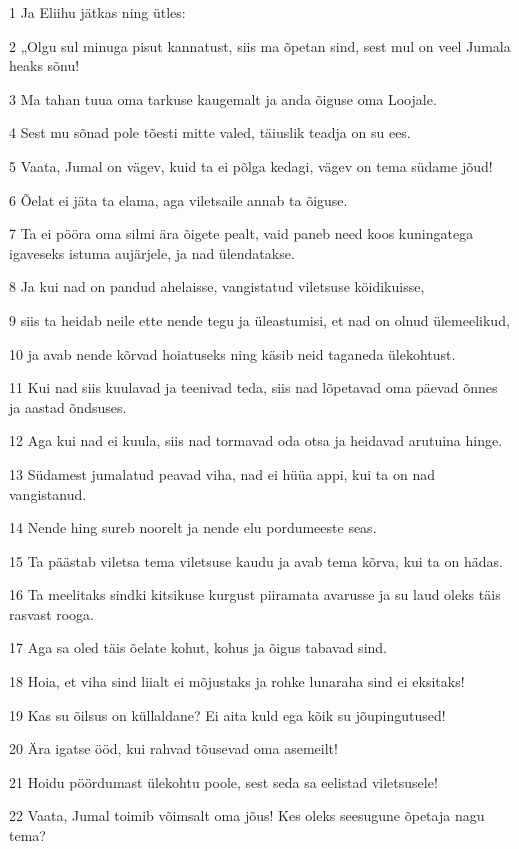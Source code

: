 \par 1 Ja Eliihu jätkas ning ütles:
\par 2 „Olgu sul minuga pisut kannatust, siis ma õpetan sind, sest mul on veel Jumala heaks sõnu!
\par 3 Ma tahan tuua oma tarkuse kaugemalt ja anda õiguse oma Loojale.
\par 4 Sest mu sõnad pole tõesti mitte valed, täiuslik teadja on su ees.
\par 5 Vaata, Jumal on vägev, kuid ta ei põlga kedagi, vägev on tema südame jõud!
\par 6 Õelat ei jäta ta elama, aga viletsaile annab ta õiguse.
\par 7 Ta ei pööra oma silmi ära õigete pealt, vaid paneb need koos kuningatega igaveseks istuma aujärjele, ja nad ülendatakse.
\par 8 Ja kui nad on pandud ahelaisse, vangistatud viletsuse köidikuisse,
\par 9 siis ta heidab neile ette nende tegu ja üleastumisi, et nad on olnud ülemeelikud,
\par 10 ja avab nende kõrvad hoiatuseks ning käsib neid taganeda ülekohtust.
\par 11 Kui nad siis kuulavad ja teenivad teda, siis nad lõpetavad oma päevad õnnes ja aastad õndsuses.
\par 12 Aga kui nad ei kuula, siis nad tormavad oda otsa ja heidavad arutuina hinge.
\par 13 Südamest jumalatud peavad viha, nad ei hüüa appi, kui ta on nad vangistanud.
\par 14 Nende hing sureb noorelt ja nende elu pordumeeste seas.
\par 15 Ta päästab viletsa tema viletsuse kaudu ja avab tema kõrva, kui ta on hädas.
\par 16 Ta meelitaks sindki kitsikuse kurgust piiramata avarusse ja su laud oleks täis rasvast rooga.
\par 17 Aga sa oled täis õelate kohut, kohus ja õigus tabavad sind.
\par 18 Hoia, et viha sind liialt ei mõjustaks ja rohke lunaraha sind ei eksitaks!
\par 19 Kas su õilsus on küllaldane? Ei aita kuld ega kõik su jõupingutused!
\par 20 Ära igatse ööd, kui rahvad tõusevad oma asemeilt!
\par 21 Hoidu pöördumast ülekohtu poole, sest seda sa eelistad viletsusele!
\par 22 Vaata, Jumal toimib võimsalt oma jõus! Kes oleks seesugune õpetaja nagu tema?
